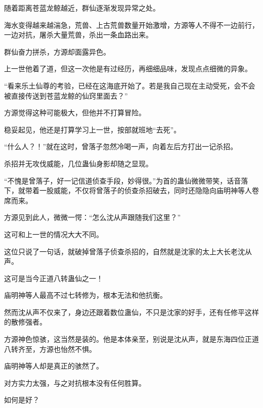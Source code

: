 \begin{this_body}
随着距离苍蓝龙鲸越近，群仙逐渐发现异常之处。

海水变得越来越湍急，荒兽、上古荒兽数量开始激增，方源等人不得不一边前行，一边对抗，屠杀大量荒兽，杀出一条血路出来。

群仙奋力拼杀，方源却面露异色。

上一世他着了道，但这一次他是有过经历，再细细品味，发现点点细微的异象。

“看来乐土仙尊的考验，已经在这海底开始了。若是我自己现在主动受死，会不会被直接传送到苍蓝龙鲸的仙窍里面去？”

方源觉得这种可能极大，但他并不打算冒险。

稳妥起见，他还是打算学习上一世，按部就班地“去死”。

“什么人？！”就在这时，曾落子忽然冷喝一声，向着左后方打出一记杀招。

杀招并无攻伐威能，几位蛊仙身影却随之显现。

“不愧是曾落子，好一记信道侦查手段，妙得很。”为首的蛊仙微微带笑，话音落下，就带着一股威能，不仅将曾落子的侦查杀招破去，同时还隐隐向庙明神等人卷席而来。

方源见到此人，微微一愕：“怎么沈从声跟随我们这里？”

这可和上一世的情况大大不同。

这位只说了一句话，就破掉曾落子侦查杀招的，自然就是沈家的太上大长老沈从声。

这可是当今正道八转蛊仙之一！

庙明神等人最高不过七转修为，根本无法和他抗衡。

然而沈从声不仅来了，身边还跟着数位蛊仙，不只是沈家的好手，还有任修平这样的散修强者。

方源神色惊骇，这当然是装的。他是本体亲至，别说是沈从声，就是东海四位正道八转齐至，方源也怡然不惧。

庙明神等人却是真正的骇然了。

对方实力太强，与之对抗根本没有任何胜算。

如何是好？

\end{this_body}

